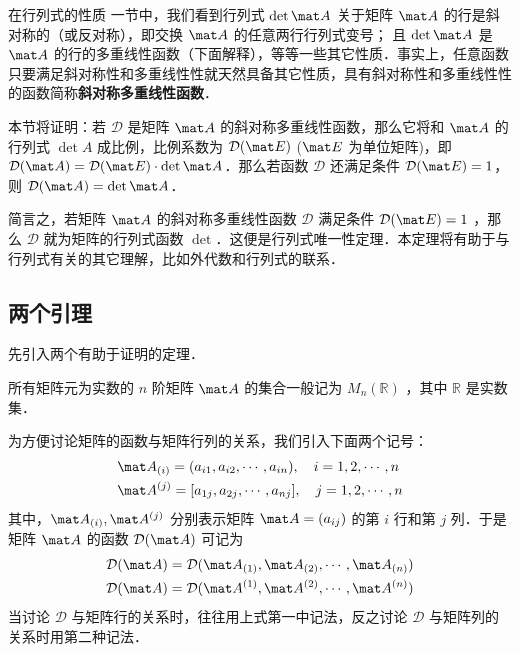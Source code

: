 
在行列式的性质 一节中，我们看到行列式 $\det \mat A$ 关于矩阵 $\mat A$ 的行是斜对称的（或反对称），即交换 $\mat A$ 的任意两行行列式变号； 且 $\det \mat A$ 是 $\mat A$ 的行的多重线性函数（下面解释），等等一些其它性质．事实上，任意函数只要满足斜对称性和多重线性性就天然具备其它性质，具有斜对称性和多重线性性的函数简称\textbf{斜对称多重线性函数}．

本节将证明：若 $\mathcal D$ 是矩阵 $\mat A$ 的斜对称多重线性函数，那么它将和 $\mat A$ 的行列式 $\det A$ 成比例，比例系数为 $\mathcal D(\mat E)$ ($\mat E$ 为单位矩阵)，即 $\mathcal D(\mat A)=\mathcal D(\mat E)\cdot \det \mat A$．那么若函数 $\mathcal D$ 还满足条件 $\mathcal D(\mat E)=1$，则 $\mathcal D(\mat A)=\det\mat A$．

简言之，若矩阵 $\mat A$ 的斜对称多重线性函数 $\mathcal D$ 满足条件 $\mathcal D(\mat E)=1$ ，那么 $\mathcal D$ 就为矩阵的行列式函数 $\det$．这便是行列式唯一性定理．本定理将有助于与行列式有关的其它理解，比如外代数和行列式的联系．

\subsection{两个引理}

先引入两个有助于证明的定理．

所有矩阵元为实数的 $n$ 阶矩阵 $\mat A$ 的集合一般记为 $M_n(\mathbb R)$ ，其中 $\mathbb R$ 是实数集．

为方便讨论矩阵的函数与矩阵行列的关系，我们引入下面两个记号：
\begin{equation}
\begin{aligned}
&\mat A_{(i)}=(a_{i1},a_{i2},\cdots,a_{in}),\quad i=1,2,\cdots, n\\
&\mat A^{(j)}=[a_{1j},a_{2j},\cdots,a_{nj}],\quad j=1,2,\cdots, n
\end{aligned}
\end{equation}
其中，$\mat A_{(i)},\mat A^{(j)}$ 分别表示矩阵 $\mat A=(a_{ij})$ 的第 $i$ 行和第 $j$ 列．于是矩阵 $\mat A$ 的函数 $\mathcal D(\mat A)$ 可记为 
\begin{equation}
\begin{aligned}
&\mathcal D(\mat A)=\mathcal D(\mat A_{(1)},\mat A_{(2)},\cdots,\mat A_{(n)})\\
&\mathcal D(\mat A)=\mathcal D(\mat A^{(1)},\mat A^{(2)},\cdots,\mat A^{(n)})\\
\end{aligned}
\end{equation}
当讨论 $\mathcal D$ 与矩阵行的关系时，往往用上式第一中记法，反之讨论 $\mathcal D$ 与矩阵列的关系时用第二种记法．

